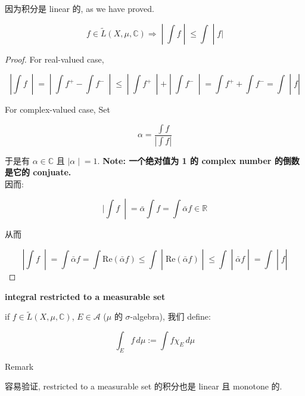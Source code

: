 \documentclass{qlnotes-export}
\begin{document}
因为积分是 linear 的, as we have proved.

\begin{proposition}

\[\left. f \in \widetilde{L}(X,\mu,{\mathbb{C}})\Longrightarrow \middle| \int f \middle| \leq \int \middle| f| \right.\]

\end{proposition}

\begin{proof}

For real-valued case,

\[\left. |\int f\  \middle| = \middle| \int f^{+} - \int f^{-}\  \middle| \leq \middle| \int f^{+}\  \middle| + \middle| \int f^{-}\  \middle| = \int f^{+} + \int f^{-} = \int \middle| f| \right.\]

For complex-valued case, Set

\[\alpha = \frac{\int f}{|\int f|}\]

于是有 \(\alpha \in {\mathbb{C}}\) 且 \(\left. |\alpha \middle| = 1 \right.\). \textbf{Note: 一个绝对值为 1 的 complex number 的倒数是它的 conjuate.}\\
因而:

\[\left. |\int f\  \middle| = \bar{\alpha}\int f = \int\bar{\alpha}f \in {\mathbb{R}} \right.\]

从而

\[\left. |\int f\  \middle| = \int\bar{\alpha}f = \int\text{Re}(\bar{\alpha}f) \leq \int \middle| \text{Re}(\bar{\alpha}f) \middle| \leq \int \middle| \bar{\alpha}f \middle| = \int \middle| f| \right.\]

\end{proof}

\begin{definition}{\protect{}\label{kn-integral-restricted-to-a-measurable-set}{\textbf{integral
restricted to a measurable set}}}

if \(f \in \widetilde{L}(X,\mu,{\mathbb{C}})\), \(E \in \mathcal{A}\) (\(\mu\) 的 \(\sigma\)-algebra), 我们 define:

\[\int_{E}f\, d\mu := \int f\chi_{E}\, d\mu\]

\end{definition}

\begin{qlremark}{Remark}

容易验证, restricted to a measurable set 的积分也是 linear 且 monotone 的.

\end{qlremark}
\end{document}
